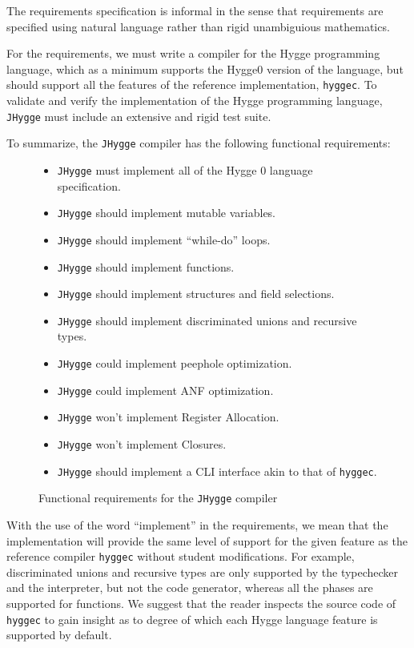 The requirements specification is informal in the sense that requirements are specified using natural language rather than rigid unambiguious mathematics.

For the requirements, we must write a compiler for the Hygge programming language, which as a minimum supports the Hygge0 version of the language,
but should support all the features of the reference implementation, \texttt{hyggec}.
To validate and verify the implementation of the Hygge programming language, \texttt{JHygge} must include an extensive and rigid test suite.

To summarize, the \texttt{JHygge} compiler has the following functional requirements:

\begin{figure}[H]
\centering  
\begin{itemize}
  \item \texttt{JHygge} must implement all of the Hygge 0 language specification.
  \item \texttt{JHygge} should implement mutable variables.
  \item \texttt{JHygge} should implement ``while-do'' loops.
  \item \texttt{JHygge} should implement functions.
  \item \texttt{JHygge} should implement structures and field selections.
  \item \texttt{JHygge} should implement discriminated unions and recursive types.
  \item \texttt{JHygge} could implement peephole optimization.
  \item \texttt{JHygge} could implement ANF optimization.
  \item \texttt{JHygge} won't implement Register Allocation.
  \item \texttt{JHygge} won't implement Closures.
  \item \texttt{JHygge} should implement a CLI interface akin to that of \texttt{hyggec}.
\end{itemize}
\caption{Functional requirements for the \texttt{JHygge} compiler}
\label{fig:functional_requirements}
\end{figure}

With the use of the word ``implement'' in the requirements, we mean that the implementation will provide the same level of support
for the given feature as the reference compiler \texttt{hyggec} without student modifications. For example, discriminated unions
and recursive types are only supported by the typechecker and the interpreter, but not the code generator, whereas all the phases
are supported for functions. We suggest that the reader inspects the source code of \texttt{hyggec} to gain insight as to
degree of which each Hygge language feature is supported by default.

